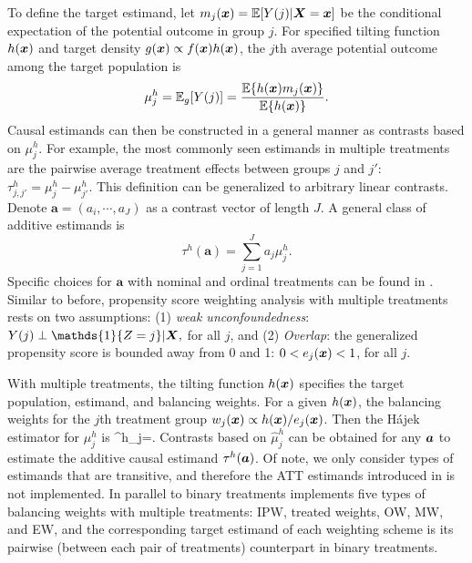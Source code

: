 To define the target estimand, let $m_j(\bm{x})=\operatorname{\mathbb E}[Y(j)|\bm{X}=\bm{x}]$ be the conditional expectation of the potential outcome in group $j$. For specified tilting function $h(\bm{x})$ and target density $g(\bm{x})\propto f(\bm{x})h(\bm{x})$, the $j$th average potential outcome among the target population is
\begin{equation} 
\label{eq:meanpo}
\mu_j^h=\operatorname{\mathbb E}_g[Y(j)]=\frac{\operatorname{\mathbb E}\{h(\bm{x})m_j(\bm{x})\}}{\operatorname{\mathbb E}\{h(\bm{x})\}}.
\end{equation}
Causal estimands can then be constructed in a general manner as contrasts based on $\mu_j^h$. For example, the most commonly seen estimands in multiple treatments are the pairwise average treatment effects between groups $j$ and $j'$: $\tau_{j,j'}^h=\mu_j^h-\mu_{j'}^h$. This definition can be generalized to arbitrary linear contrasts. Denote $\pmb{a}=(a_{i},\cdots, a_{J})$ as a contrast vector of length $J$. A general class of additive estimands is 
\begin{equation} \label{eq:meantau}
\tau^h(\pmb{a})=\sum\limits_{j=1}^{J}a_j\mu_j^h.    
\end{equation}
Specific choices for $\bm{a}$ with nominal and ordinal treatments can be found in \citet{li2019propensity}. Similar to before, propensity score weighting analysis with multiple treatments rests on two assumptions: (1) \emph{weak unconfoundedness}: $Y(j)\perp \mathds{1}\{Z=j\} |\bX,$ for all $j$, and (2) \emph{Overlap}: the generalized propensity score is bounded away from 0 and 1: $0<e_j(\bm{x})<1$, for all $j$. 


With multiple treatments, the tilting function $h(\bm{x})$ specifies the target population, estimand, and balancing weights. For a given $h(\bm{x})$, the balancing weights for the $j$th treatment group  $w_j(\bm{x})\propto {h(\bm{x})}/{e_j(\bm{x})}$. Then the H\'{a}jek estimator for $\mu_j^h$ is 
\be
\label{eq:simplemean}
\hat{\mu}^h_j=.
\ee
Contrasts based on $\hat{\mu}^h_j$ can be obtained for any $\bm{a}$ to estimate the additive causal estimand $\tau^h(\bm{a})$. Of note, we only consider types of estimands that are transitive, and therefore the ATT estimands introduced in \citet{lechner2001} is not implemented. In parallel to binary treatments  implements five types of balancing weights with multiple treatments: IPW, treated weights, OW, MW, and EW, and the corresponding target estimand of each weighting scheme is its pairwise (between each pair of treatments) counterpart in binary treatments.  
 
